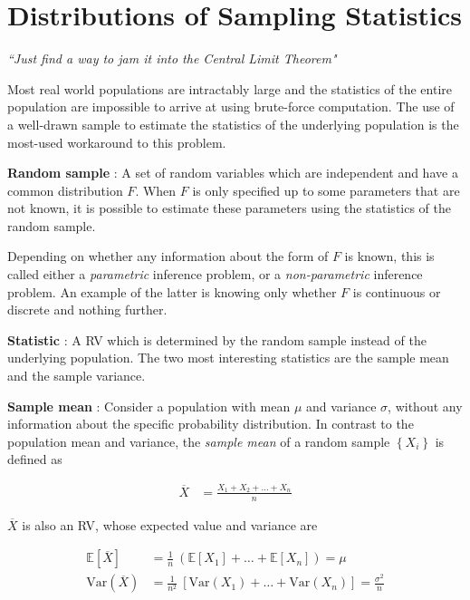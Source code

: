 \chapter{Distributions of Sampling Statistics}


\begin{flushright}
	\textit{``Just find a way to jam it into the Central Limit Theorem"}
\end{flushright}

Most real world populations are intractably large and the statistics of the entire population are impossible to arrive at using brute-force computation. The use of a well-drawn sample to estimate the statistics of the underlying population is the most-used workaround to this problem.

\textbf{Random sample} : A set of random variables which are independent and have a common distribution $ F $. When $ F $ is only specified up to some parameters that are not known, it is possible to estimate these parameters using the statistics of the random sample.

Depending on whether any information about the form of $ F $ is known, this is called either a  \textit{parametric} inference problem, or a \textit{non-parametric} inference problem. An example of the latter is knowing only whether $ F $ is continuous or discrete and nothing further.

\textbf{Statistic} : A RV which is determined by the random sample instead of the underlying population. The two most interesting statistics are the sample mean and the sample variance.

\textbf{Sample mean} : Consider a population with mean $ \mu $ and variance $ \sigma $, without any information about the specific probability distribution. In contrast to the population mean and variance, the \textit{sample mean} of a random sample $ \left\{X_i\right\} $ is defined as

\begin{align}
	\overline{X} &= \frac{X_1 + X_2 + \dots + X_n}{n}
\end{align}

$ \overline{X} $ is also an RV, whose expected value and variance are

\begin{align}
	\mathbb{E}[\overline{X}] &= \frac{1}{n}\ \left(\mathbb{E}[X_1] + \dots + \mathbb{E}[X_n]\right) = \mu \\
	\mathrm{Var}(\overline{X}) &= \frac{1}{n^2}\ \left[\mathrm{Var}(X_1) + \dots + \mathrm{Var}(X_n)\right] = \frac{\sigma^2}{n}
\end{align}

